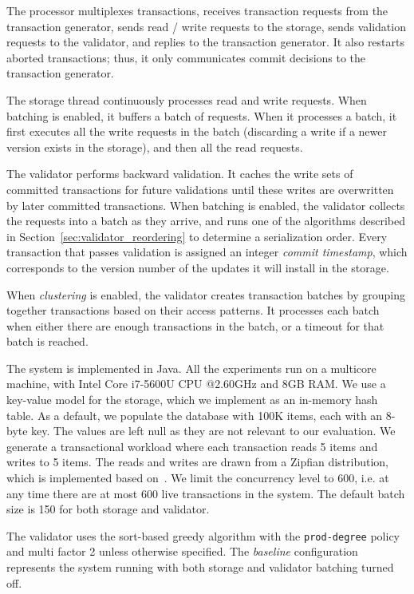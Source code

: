 The processor multiplexes transactions, receives transaction requests from the transaction generator, sends read / write requests to the storage, sends validation requests to the validator, and replies to the transaction generator. It also restarts aborted transactions; thus, it only communicates commit decisions to the transaction generator. 

The storage thread continuously processes read and write requests. When batching is enabled, it buffers a batch of requests. When it processes a batch, it first executes all the write requests in the batch (discarding a write if a newer version exists in the storage), and then all the read requests.

The validator performs backward validation. It caches the write sets of committed transactions for future validations until these writes are overwritten by later committed transactions. 
When batching is enabled, the validator collects the requests into a batch as they arrive, and runs one of the algorithms described in Section~\ref{sec:validator_reordering} to determine a serialization order. Every transaction that passes validation is assigned an integer \emph{commit timestamp}, which corresponds to the version number of the updates it will install in the storage.

When \emph{clustering} is enabled, the validator creates transaction batches by grouping together transactions based on their access patterns. It processes each batch when either there are enough transactions in the batch, or a timeout for that batch is reached.

The system is implemented in Java. All the experiments run on a multicore machine, with Intel Core i7-5600U CPU @2.60GHz and 8GB RAM. We use a key-value model for the storage, which we implement as an in-memory hash table. As a default, we populate the database with 100K items, each with an 8-byte key. The values are left null as they are not relevant to our evaluation. We generate a transactional workload where each transaction reads 5 items and writes to 5 items. The reads and writes are drawn from a Zipfian distribution, which is implemented based on~\cite{gray1994quickly}. We limit the concurrency level to 600, i.e. at any time there are at most 600 live transactions in the system. The default batch size is 150 for both storage and validator.

The validator uses the sort-based greedy algorithm with the \texttt{prod-degree} policy and multi factor 2 unless otherwise specified. The \emph{baseline} configuration represents the system running with both storage and validator batching turned off. 

